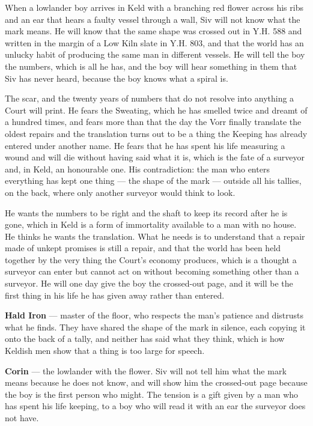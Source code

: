 \documentclass{design/chronicle}
\begin{document}
{When a lowlander boy arrives in Keld with a branching red flower across his ribs and an ear that hears a faulty vessel through a wall, Siv will not know what the mark means. He will know that the same shape was crossed out in Y.H. 588 and written in the margin of a Low Kiln slate in Y.H. 803, and that the world has an unlucky habit of producing the same man in different vessels. He will tell the boy the numbers, which is all he has, and the boy will hear something in them that Siv has never heard, because the boy knows what a spiral is.

The scar, and the twenty years of numbers that do not resolve into anything a Court will print. He fears the Sweating, which he has smelled twice and dreamt of a hundred times, and fears more than that the day the Vorr finally translate the oldest repairs and the translation turns out to be a thing the Keeping has already entered under another name. He fears that he has spent his life measuring a wound and will die without having said what it is, which is the fate of a surveyor and, in Keld, an honourable one. His contradiction: the man who enters everything has kept one thing — the shape of the mark — outside all his tallies, on the back, where only another surveyor would think to look.

He wants the numbers to be right and the shaft to keep its record after he is gone, which in Keld is a form of immortality available to a man with no house. He thinks he wants the translation. What he needs is to understand that a repair made of unkept promises is still a repair, and that the world has been held together by the very thing the Court’s economy produces, which is a thought a surveyor can enter but cannot act on without becoming something other than a surveyor. He will one day give the boy the crossed-out page, and it will be the first thing in his life he has given away rather than entered.

\textbf{Hald Iron} — master of the floor, who respects the man’s patience and distrusts what he finds. They have shared the shape of the mark in silence, each copying it onto the back of a tally, and neither has said what they think, which is how Keldish men show that a thing is too large for speech.

\textbf{Corin} — the lowlander with the flower. Siv will not tell him what the mark means because he does not know, and will show him the crossed-out page because the boy is the first person who might. The tension is a gift given by a man who has spent his life keeping, to a boy who will read it with an ear the surveyor does not have.

}
\end{document}
